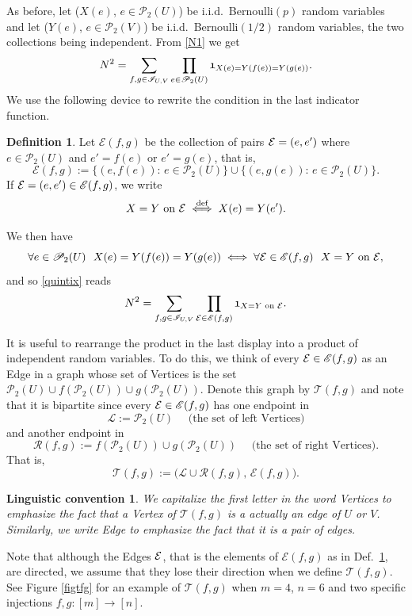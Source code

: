 \documentclass[reqno]{amsart}
\def\red{\color{red}}
\theoremstyle{theorem}
\newtheorem{ling}[theorem]{Linguistic convention}
\theoremstyle{definition}
\newtheorem{definition}[theorem]{Definition}
\theoremstyle{remark}
\def\PP{\mathscr{P}}
\def\LL{\mathscr{L}}
\def\RR{\mathscr{R}}
\def\TT{\mathscr{T}}
\def\EE{\mathscr{E}}
\newcommand{\1}{{\text{\Large $\mathfrak 1$}}}	%
\numberwithin{equation}{section}
\def\II{\mathscr I}
\def\ee{\text{\footnotesize $\mathcal E$}}
\def\eee{\text{\tiny $\mathcal E$}}
\begin{document}
As before, let ($X(e)$, $e \in \PP_2(U)$) be i.i.d.\ Bernoulli$(p)$ random
variables and let ($Y(e)$, $e \in \PP_2(V)$) be i.i.d.\ Bernoulli$(1/2)$ random
variables, the two collections being independent.
From \eqref{N1} we get
\begin{equation}
\label{quintix}
N^2 =  \sum_{f, g \in \II_{U,V}} \prod_{e \in \PP_2(U)} \1_{X(e)=Y(f(e))=Y(g(e))}.
\end{equation}
We use the following device to rewrite the condition in the last indicator 
function.
\begin{definition}
\label{croesus}
Let $\EE(f,g)$ be the collection of pairs
$\ee = (e, e')$ where $e \in \PP_2(U)$ and $e'=f(e)$ or
$e'=g(e)$, that is,
\[
\EE(f,g):= \big\{ (e, f(e)):\, e \in \PP_2(U)\big\}
\cup \big\{ (e, g(e)):\, e \in \PP_2(U)\big\}.
\]
If $\ee = (e, e') \in \EE(f,g)$, 
we write
\[
X=Y \text{ on } \ee \overset{\text{def}}{\iff} X(e)=Y(e').
\]
\end{definition}
We then have
\[
\forall e \in \PP_2(U)~~ X(e) = Y(f(e))=Y(g(e)) 
\iff 
\forall \ee \in \EE(f,g)~~  X=Y \text{ on } \ee,
\]
and so \eqref{quintix} reads
\begin{equation}
\label{sextix}
N^2 = \sum_{f,g \in \II_{U,V}} 
\prod_{\eee \in \EE(f,g)} \1_{X=Y \text{ on } \eee}.
\end{equation}

It is useful to rearrange the product in the last display into
a product of independent random variables. To do this,
we think of every $\ee \in \EE(f,g)$ as an Edge
in a graph whose set of Vertices is the set 
$\PP_2(U) \cup f(\PP_2(U)) \cup g(\PP_2(U))$.
Denote this graph by $\TT(f,g)$ and note that it is bipartite
since every $\ee \in \EE(f,g)$ has one endpoint in 
\begin{equation}
\label{LeftV}
\LL:=\PP_2(U) \quad \text{ (the set of left Vertices)}
\end{equation}
and another endpoint in 
\begin{equation}
\label{RightV}
\RR(f,g):=f(\PP_2(U)) \cup g(\PP_2(U)) \quad \text{ (the set of right Vertices)}.
\end{equation}
That is,
\begin{equation}
\label{Tgraph}
\TT(f,g) := \big( \LL \cup \RR(f,g), \, \EE(f,g)\big).
\end{equation}
\begin{ling}
We capitalize the first letter in the word Vertices to emphasize the fact
that a Vertex of $\TT(f,g)$ is a actually an edge of $U$ or $V$. 
Similarly, we write Edge to emphasize the fact that it is a pair
of edges.
\end{ling}
Note that although the Edges $\ee$, that is the elements of $\EE(f,g)$
as in Def.\ \ref{croesus}, are directed, we assume that they lose their
direction when we define $\TT(f,g)$.
See Figure \ref{figtfg} for an example of $\TT(f,g)$ when                         
$m=4$, $n=6$ and two specific injections $f, g: [m]\to [n]$.
\end{document}
